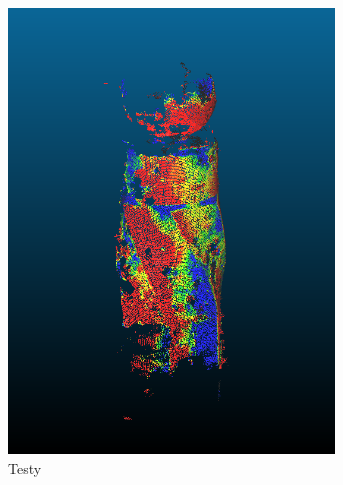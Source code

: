 \documentclass[./00PhotoBox.tex]{subfiles}
\begin{document}
\begin{figure}
\begin{subfigure}{0.3\textwidth}
        \includegraphics[width=0.95\textwidth]{img/testy_diff.png}
        \caption{Testy}
        \label{img:differenz_testy}
    \end{subfigure}
    \begin{subfigure}{0.3\textwidth}

\end{subfigure}
\end{figure}
\end{document}
